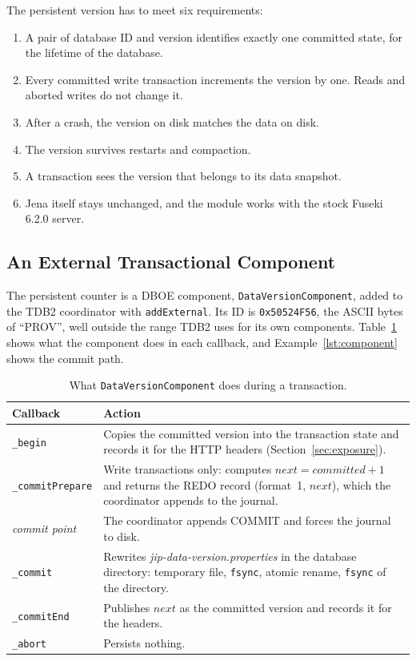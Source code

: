\documentclass[11pt,a4paper]{article}
\newcommand{\code}[1]{\texttt{#1}}
\newcommand{\file}[1]{\textit{#1}}
\begin{document}
The persistent version has to meet six requirements:

\begin{enumerate}[label=\textbf{R\arabic*}, leftmargin=3em]
\item A pair of database ID and version identifies exactly one committed state, for the
  lifetime of the database.
\item Every committed write transaction increments the version by one. Reads and aborted
  writes do not change it.
\item After a crash, the version on disk matches the data on disk.
\item The version survives restarts and compaction.
\item A transaction sees the version that belongs to its data snapshot.
\item Jena itself stays unchanged, and the module works with the stock Fuseki 6.2.0 server.
\end{enumerate}

\subsection{An External Transactional Component}
\label{sec:component}

The persistent counter is a DBOE component, \code{DataVersionComponent}, added to the TDB2
coordinator with \code{addExternal}. Its ID is \code{0x50524F56}, the ASCII bytes of
\enquote{PROV}, well outside the range TDB2 uses for its own components.
Table~\ref{tab:lifecycle} shows what the component does in each callback, and
Example~\ref{lst:component} shows the commit path.

\begin{table}[ht]
\centering
\caption{What \code{DataVersionComponent} does during a transaction.}
\label{tab:lifecycle}
\small
\begin{tabularx}{\linewidth}{@{}>{\raggedright\arraybackslash}p{30mm}>{\raggedright\arraybackslash}X@{}}
\toprule
Callback & Action \\
\midrule
\code{\_begin} & Copies the committed version into the transaction state and records it for
the HTTP headers (Section~\ref{sec:exposure}). \\
\code{\_commitPrepare} & Write transactions only: computes $\mathit{next} =
\mathit{committed} + 1$ and returns the REDO record (format~1, $\mathit{next}$), which the
coordinator appends to the journal. \\
\textit{commit point} & The coordinator appends COMMIT and forces the journal to disk. \\
\code{\_commit} & Rewrites \file{jip-data-version.properties} in the database directory:
temporary file, \code{fsync}, atomic rename, \code{fsync} of the directory. \\
\code{\_commitEnd} & Publishes $\mathit{next}$ as the committed version and records it for the
headers. \\
\code{\_abort} & Persists nothing. \\
\bottomrule
\end{tabularx}
\end{table}
\end{document}
